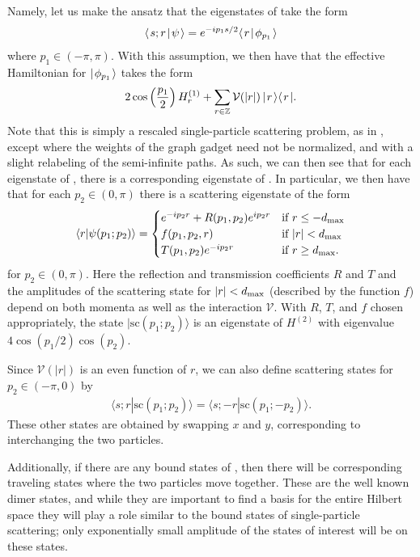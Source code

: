 \documentclass[../thesis-main/thesis-main]{subfiles}
\begin{document}
Namely, let us make the ansatz that the eigenstates of  take the form
\begin{align}
  \langle\mspace{2mu} s;r \mspace{2mu} | \mspace{2mu} \psi\mspace{2mu} \rangle = e^{ - i p_1 s/2} \langle\mspace{2mu} r \mspace{2mu} | \mspace{2mu} \phi_{p_1}\mspace{2mu} \rangle
\end{align}
where $p_1 \in (-\pi,\pi)$.  With this assumption, we then have that the effective Hamiltonian for $|\mspace{2mu} \phi_{p_1} \mspace{2mu} \rangle$ takes the form
\begin{equation}
 2\cos\left(\frac{p_1}{2}\right) H^{(1)}_r + \sum_{r\in \mathbb{Z}} \mathcal{V}(|r|) \, |\mspace{2mu} r \mspace{2mu} \rangle\langle\mspace{2mu} r \mspace{2mu} |.\label{eq:vr_eqn}
\end{equation}
Note that this is simply a rescaled single-particle scattering problem, as in , except where the weights of the graph gadget need not be normalized, and with a slight relabeling of the semi-infinite paths.  As such, we can then see that for each eigenstate of , there is a corresponding eigenstate of .  In particular, we then have that for each $p_2\in (0,\pi)$ there is a scattering eigenstate of the form
\begin{equation}
\langle r|\psi (p_1;p_2)\rangle= \begin{cases}  e^{-i p_2 r} + R(p_1,p_2) e^{i p_2 r} &  \text{if } r \leq -d_{\text{max}}\\
  	f(p_1,p_2,r) &  \text{if } |r| < d_{\text{max}}\\
  	T(p_1,p_2) e^{- i p_2 r}  & \text{if } r \geq d_{\text{max}}.\end{cases}
\label{eq:psip1p2}
\end{equation}
for $p_2\in (0,\pi)$. Here the reflection and transmission coefficients $R$ and $T$ and the amplitudes of the scattering state for $|r|<d_{\text{max}}$ (described by the function $f$) depend on both momenta as well as the interaction $\mathcal{V}$.  With $R$, $T$, and $f$ chosen appropriately, the state $|\mathrm{sc}(p_1;p_2)\rangle$ is an eigenstate of $H^{(2)}$ with eigenvalue $4\cos(p_1/2)\cos(p_2)$.

Since $\mathcal{V}(|r|)$ is an even function of $r$, we can also define scattering states for $p_2\in (-\pi,0)$ by
\begin{align}
  \langle s;r|\mathrm{sc}(p_1;p_2)\rangle=\langle s;-r|\mathrm{sc}(p_1;-p_2)\rangle.
\end{align}
These other states are obtained by swapping $x$ and $y$, corresponding to interchanging the two particles.

Additionally, if there are any bound states of , then there will be corresponding traveling states where the two particles move together.  These are the well known dimer states, and while they are important to find a basis for the entire Hilbert space they will play a role similar to the bound states of single-particle scattering; only exponentially small amplitude of the states of interest will be on these states.
\end{document}
